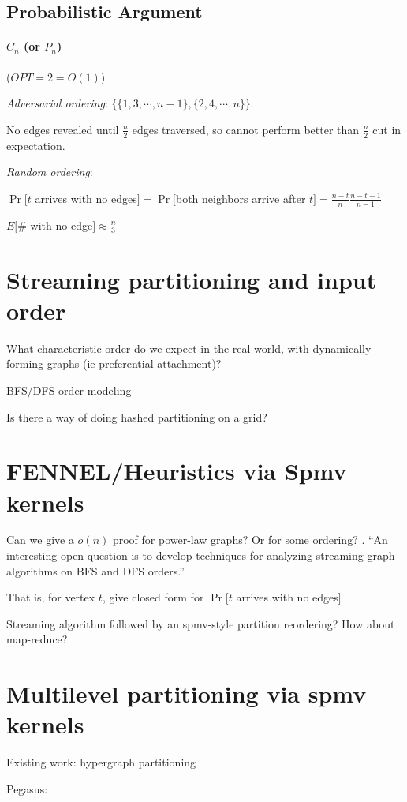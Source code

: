 \documentclass[11pt]{article}
\begin{document}
\subsection{Probabilistic Argument}
\paragraph{$C_n$ (or $P_n$)} ($OPT=2=O(1)$)

\textit{Adversarial ordering}: $\{ \{ 1,3, \cdots , n-1\},\{ 2, 4, \cdots, n \}\}$. 

No edges revealed until $\frac{n}{2}$ edges traversed, so cannot perform better than $\frac{n}{2}$ cut in expectation.

\textit{Random ordering}: 

$\Pr[t $ arrives with no edges$]  =  \Pr[$both neighbors arrive after $ t ]  = \frac{n-t}{n}\frac{n-t-1}{n-1}$ 

$E[\# $ with no edge$] \approx \frac{n}{3}$

\section{Streaming partitioning and input order}
What characteristic order do we expect in the real world, with dynamically forming graphs (ie preferential attachment)?

BFS/DFS order modeling

Is there a way of doing hashed partitioning on a grid?

\section{FENNEL/Heuristics via Spmv kernels}
Can we give a $o(n)$ proof for power-law graphs? Or for some ordering? \cite{DBLP:journals/corr/abs-1212-1121}. ``An interesting open question is to develop techniques for analyzing streaming graph algorithms on BFS and DFS orders.''

That is, for vertex $t$, give closed form for $\Pr[t $ arrives with no edges$]$

Streaming algorithm followed by an spmv-style partition reordering? How about map-reduce?

\section{Multilevel partitioning via spmv kernels}
Existing work: hypergraph partitioning

Pegasus: \cite{kang2009pegasus}
\end{document}
